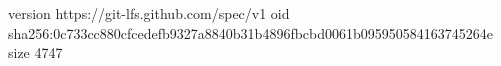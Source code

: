version https://git-lfs.github.com/spec/v1
oid sha256:0c733cc880cfcedefb9327a8840b31b4896fbcbd0061b095950584163745264e
size 4747
